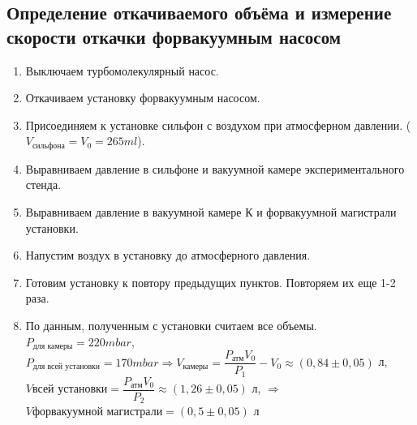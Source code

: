 \documentclass[a4paper, 12pt]{article}%
\begin{document}
\subsection*{Определение откачиваемого объёма и измерение скорости откачки форвакуумным насосом}
\begin{enumerate}
\item Выключаем турбомолекулярный насос.
\item Откачиваем установку форвакуумным насосом.
\item Присоединяем к установке сильфон с воздухом при атмосферном давлении. ($V_{\text{сильфона}} = V_0 = 265 ml$).
\item Выравниваем давление в сильфоне и вакуумной камере экспериментального стенда.
\item Выравниваем давление в вакуумной камере К и форвакуумной магистрали установки.
\item Напустим воздух в установку до атмосферного давления.
\item Готовим установку к повтору предыдущих пунктов. Повторяем их еще 1-2 раза.
\item По данным, полученным с установки считаем все объемы.
$P_{\text{для камеры}} = 220 mbar$, $P_{\text{для всей установки}} = 170 mbar \Rightarrow V_{\text{камеры}} = \dfrac{P_{\text{атм}} V_0}{P_1} - V_{0} \approx (0,84 \pm 0,05)$ л,  $V{\text{всей установки}} = \dfrac{P_{\text{атм}} V_0}{P_2} \approx (1,26 \pm 0,05) $ л, $ \Rightarrow$  \\ 
$V{\text{форвакуумной магистрали}} = (0,5 \pm 0,05) $ л


\end{enumerate}
\end{document}
